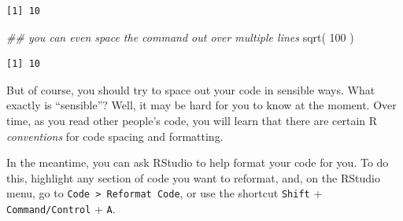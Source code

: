\documentclass[
  letterpaper,
  DIV=11,
  numbers=noendperiod]{scrreprt}
\newenvironment{Shaded}{\begin{snugshade}}{\end{snugshade}}
\newcommand{\DecValTok}[1]{\textcolor[rgb]{0.68,0.00,0.00}{#1}}
\newcommand{\DocumentationTok}[1]{\textcolor[rgb]{0.37,0.37,0.37}{\textit{#1}}}
\newcommand{\FunctionTok}[1]{\textcolor[rgb]{0.28,0.35,0.67}{#1}}
\newcommand{\NormalTok}[1]{\textcolor[rgb]{0.00,0.23,0.31}{#1}}
\begin{document}
\begin{verbatim}
[1] 10
\end{verbatim}

\begin{Shaded}
\begin{Highlighting}[]
\DocumentationTok{\#\# you can even space the command out over multiple lines}
\FunctionTok{sqrt}\NormalTok{(  }
  \DecValTok{100}
\NormalTok{    )}
\end{Highlighting}
\end{Shaded}

\begin{verbatim}
[1] 10
\end{verbatim}

But of course, you should try to space out your code in sensible ways.
What exactly is ``sensible''? Well, it may be hard for you to know at
the moment. Over time, as you read other people's code, you will learn
that there are certain R \emph{conventions} for code spacing and
formatting.

In the meantime, you can ask RStudio to help format your code for you.
To do this, highlight any section of code you want to reformat, and, on
the RStudio menu, go to \texttt{Code\ \textgreater{}\ Reformat\ Code},
or use the shortcut \texttt{Shift} + \texttt{Command/Control} +
\texttt{A}.
\end{document}
